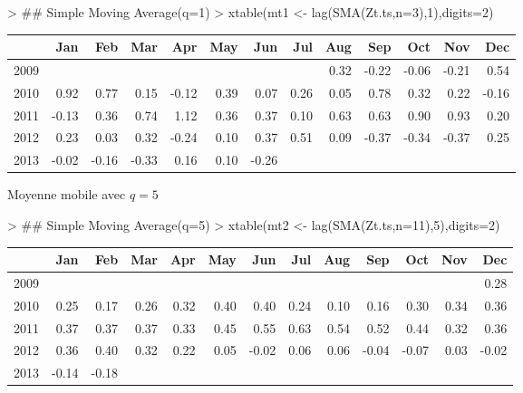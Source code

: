 \begin{solution}{1.1}
\begin{enumerate}
\begin{Schunk}
\begin{Sinput}
> ## Simple Moving Average(q=1)
> xtable(mt1 <- lag(SMA(Zt.ts,n=3),1),digits=2)
\end{Sinput}
\begin{table}[ht]
\centering
\begin{tabular}{rrrrrrrrrrrrr}
  \hline
 & Jan & Feb & Mar & Apr & May & Jun & Jul & Aug & Sep & Oct & Nov & Dec \\
  \hline
2009 &  &  &  &  &  &  &  & 0.32 & -0.22 & -0.06 & -0.21 & 0.54 \\
  2010 & 0.92 & 0.77 & 0.15 & -0.12 & 0.39 & 0.07 & 0.26 & 0.05 & 0.78 & 0.32 & 0.22 & -0.16 \\
  2011 & -0.13 & 0.36 & 0.74 & 1.12 & 0.36 & 0.37 & 0.10 & 0.63 & 0.63 & 0.90 & 0.93 & 0.20 \\
  2012 & 0.23 & 0.03 & 0.32 & -0.24 & 0.10 & 0.37 & 0.51 & 0.09 & -0.37 & -0.34 & -0.37 & 0.25 \\
  2013 & -0.02 & -0.16 & -0.33 & 0.16 & 0.10 & -0.26 &  &  &  &  &  &  \\
   \hline
\end{tabular}
\end{table}\end{Schunk}
Moyenne mobile avec $q=5$
\begin{Schunk}
\begin{Sinput}
> ## Simple Moving Average(q=5)
> xtable(mt2 <- lag(SMA(Zt.ts,n=11),5),digits=2)
\end{Sinput}
\begin{table}[ht]
\centering
\begin{tabular}{rrrrrrrrrrrrr}
  \hline
 & Jan & Feb & Mar & Apr & May & Jun & Jul & Aug & Sep & Oct & Nov & Dec \\
  \hline
2009 &  &  &  &  &  &  &  &  &  &  &  & 0.28 \\
  2010 & 0.25 & 0.17 & 0.26 & 0.32 & 0.40 & 0.40 & 0.24 & 0.10 & 0.16 & 0.30 & 0.34 & 0.36 \\
  2011 & 0.37 & 0.37 & 0.37 & 0.33 & 0.45 & 0.55 & 0.63 & 0.54 & 0.52 & 0.44 & 0.32 & 0.36 \\
  2012 & 0.36 & 0.40 & 0.32 & 0.22 & 0.05 & -0.02 & 0.06 & 0.06 & -0.04 & -0.07 & 0.03 & -0.02 \\
  2013 & -0.14 & -0.18 &  &  &  &  &  &  &  &  &  &  \\

\end{tabular}
\end{table}
\end{Schunk}
\end{enumerate}
\end{solution}
